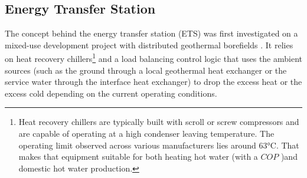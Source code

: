 \subsection{Energy Transfer Station} \label{sec:ets}

The concept behind the energy transfer station (ETS) was first investigated on a mixed-use development project with distributed geothermal borefields \cite{Sidewalk} . It relies on heat recovery chillers\footnote{Heat recovery chillers are typically built with scroll or screw compressors and are capable of operating at a high condenser leaving temperature. The operating limit observed across various manufacturers lies around 63°C. That makes that equipment suitable for both heating hot water (with a $COP$ )and domestic hot water production.} and a load balancing control logic that uses the ambient sources (such as the ground through a local geothermal heat exchanger or the service water through the interface heat exchanger) to drop the excess heat or the excess cold depending on the current operating conditions.

